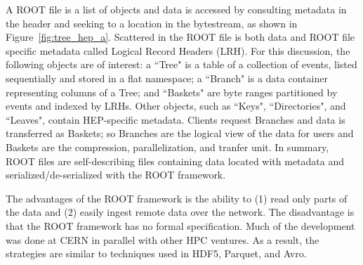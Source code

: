 A ROOT file is a list of objects and data is accessed by consulting metadata in
the header and seeking to a location in the bytestream, as shown in
Figure~\ref{fig:tree_hep_a}. Scattered in the ROOT file is both data and ROOT
file specific metadata called Logical Record Headers (LRH).  For this
discussion, the following objects are of interest: a ``Tree" is a table of a
collection of events, listed sequentially and stored in a flat namespace; a
``Branch" is a data container representing columns of a Tree; and ``Baskets"
are byte ranges partitioned by events and indexed by LRHs.  Other objects, such
as ``Keys", ``Directories", and ``Leaves", contain HEP-specific metadata.
Clients request Branches and data is transferred as Baskets; so Branches are
the logical view of the data for users and Baskets are the compression,
parallelization, and tranfer unit. In summary, ROOT files are self-describing
files containing data located with metadata and serialized/de-serialized with
the ROOT framework.

The advantages of the ROOT framework is the ability to (1) read only parts of
the data and (2) easily ingest remote data over the network. The disadvantage
is that the ROOT framework has no formal specification. Much of the development
was done at CERN in parallel with other HPC ventures. As a result, the
strategies are similar to techniques used in HDF5, Parquet, and Avro.

%
%
%
%
%
%
%
%


